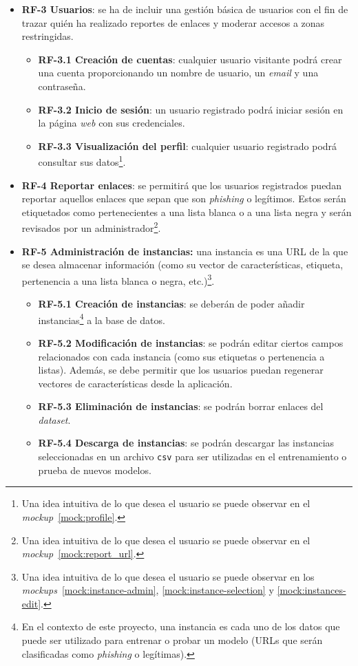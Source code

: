 \begin{itemize}
	\item \textbf{RF-3 Usuarios}: se ha de incluir una gestión básica de usuarios con el fin de trazar quién ha realizado reportes de enlaces y moderar accesos a zonas restringidas.
	\begin{itemize}
	\item \textbf{RF-3.1 Creación de cuentas}: cualquier usuario visitante podrá crear una cuenta proporcionando un nombre de usuario, un \textit{email} y una contraseña.
	\item \textbf{RF-3.2 Inicio de sesión}: un usuario registrado podrá iniciar sesión en la página \textit{web} con sus credenciales.
	\item \textbf{RF-3.3 Visualización del perfil}: cualquier usuario registrado podrá consultar sus datos\footnote{Una idea intuitiva de lo que desea el usuario se puede observar en el \textit{mockup}~\ref{mock:profile}.}.
	\end{itemize}

	\item \textbf{RF-4 Reportar enlaces}: se permitirá que los usuarios registrados puedan reportar aquellos enlaces que sepan que son \textit{phishing} o legítimos. Estos serán etiquetados como pertenecientes a una lista blanca o a una lista negra y serán revisados por un administrador\footnote{Una idea intuitiva de lo que desea el usuario se puede observar en el \textit{mockup}~\ref{mock:report_url}.}.
	
	\item \textbf{RF-5 Administración de instancias:} una instancia es una URL de la que se desea almacenar información (como su vector de características, etiqueta, pertenencia a una lista blanca o negra, etc.)\footnote{Una idea intuitiva de lo que desea el usuario se puede observar en los \textit{mockups}~\ref{mock:instance-admin}, \ref{mock:instance-selection} y \ref{mock:instances-edit}.}.
	\begin{itemize}
		\item \textbf{RF-5.1 Creación de instancias}: se deberán de poder añadir instancias\footnote{En el contexto de este proyecto, una instancia es cada uno de los datos que puede ser utilizado para entrenar o probar un modelo (URLs que serán clasificadas como \textit{phishing} o legítimas).}  a la base de datos.
		\item \textbf{RF-5.2 Modificación de instancias}: se podrán editar ciertos campos relacionados con cada instancia (como sus etiquetas o pertenencia a listas). Además, se debe permitir que los usuarios puedan regenerar vectores de características desde la aplicación.
		\item \textbf{RF-5.3 Eliminación de instancias}: se podrán borrar enlaces del \textit{dataset}.
		\item \textbf{RF-5.4 Descarga de instancias}: se podrán descargar las instancias seleccionadas en un archivo \texttt{csv} para ser utilizadas en el entrenamiento o prueba de nuevos modelos.
	\end{itemize}
	

\end{itemize}
